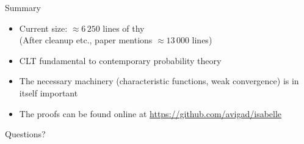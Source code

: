 \documentclass[usepdftitle=false]{beamer}
\begin{document}
\begin{frame}{Summary} %
\begin{itemize}

\item Current size: $\approx 6\,250$ lines of thy\\
  (After cleanup etc., paper mentions $\approx 13\,000$ lines)

\pause

\item CLT fundamental to contemporary probability theory

\pause

\item The necessary machinery (characteristic functions, weak convergence) is in itself important

\item The proofs can be found online at \url{https://github.com/avigad/isabelle}

\end{itemize}


\begin{center} \LARGE Questions? \end{center}

\end{frame} %
\end{document}
